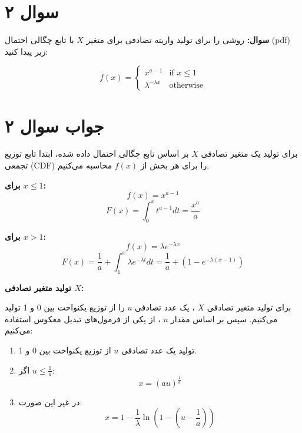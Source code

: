 \section*{سوال ۲}

\textbf{سوال:} روشی را برای تولید واریته تصادفی برای متغیر \( X \) با تابع چگالی احتمال (pdf) زیر پیدا کنید:

\[
f(x) = 
\begin{cases} 
	x^{a-1} & \text{if } x \leq 1 \\
	\lambda^{-\lambda x} & \text{otherwise}
\end{cases}
\]

\section*{جواب سوال ۲}

برای تولید یک متغیر تصادفی \( X \) بر اساس تابع چگالی احتمال داده شده، ابتدا تابع توزیع تجمعی (CDF) را برای هر بخش از \( f(x) \) محاسبه می‌کنیم.

\textbf{برای \( x \leq 1 \):}
\[ f(x) = x^{a-1} \]
\[ F(x) = \int_{0}^{x} t^{a-1} dt = \frac{x^a}{a} \]

\textbf{برای \( x > 1 \):}
\[ f(x) = \lambda e^{-\lambda x} \]
\[ F(x) = \frac{1}{a} + \int_{1}^{x} \lambda e^{-\lambda t} dt = \frac{1}{a} + (1 - e^{-\lambda (x - 1)}) \]

\textbf{تولید متغیر تصادفی \( X \):}


برای تولید متغیر تصادفی
$X$
، یک عدد تصادفی
$u$
را از توزیع یکنواخت بین 0 و 1 تولید می‌کنیم. سپس بر اساس مقدار 
$u$
، از یکی از فرمول‌های تبدیل معکوس استفاده می‌کنیم:

\begin{enumerate}
	\item تولید یک عدد تصادفی \( u \) از توزیع یکنواخت بین 0 و 1.
	\item اگر \( u \leq \frac{1}{a} \):
	\[ x = (au)^{\frac{1}{a}} \]
	\item در غیر این صورت:
	\[ x = 1 - \frac{1}{\lambda} \ln(1 - (u - \frac{1}{a})) \]
\end{enumerate}